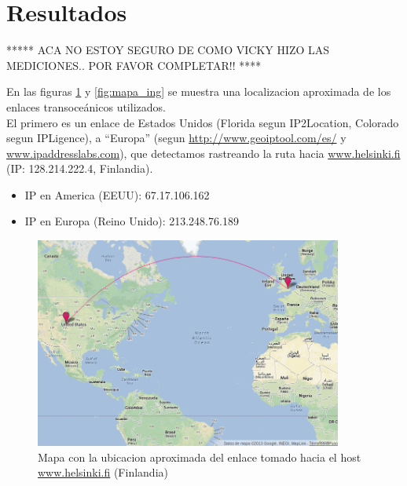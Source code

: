 \section{Resultados}



***** ACA NO ESTOY SEGURO DE COMO VICKY HIZO LAS MEDICIONES.. POR FAVOR COMPLETAR!! ****

En las figuras \ref{fig:mapa_fin} y \ref{fig:mapa_ing} se muestra una localizacion aproximada de los enlaces transoceánicos utilizados.\\

El primero es un enlace de Estados Unidos (Florida segun IP2Location, Colorado segun IPLigence), a ``Europa'' (segun \url{http://www.geoiptool.com/es/} y \url{www.ipaddresslabs.com}), que detectamos rastreando la ruta hacia \url{www.helsinki.fi} (IP: 128.214.222.4, Finlandia). \\

\begin{itemize}
 \item IP en America (EEUU): 67.17.106.162
 \item IP en Europa (Reino Unido): 213.248.76.189\\
\end{itemize}

\begin{figure}[H]
  \centering
    \includegraphics[width=0.9\textwidth]{imgs/finlandia_enlace_1.png}
    \caption{Mapa con la ubicacion aproximada del enlace tomado hacia el host \url{www.helsinki.fi} (Finlandia)}
    \label{fig:mapa_fin}
\end{figure}    

